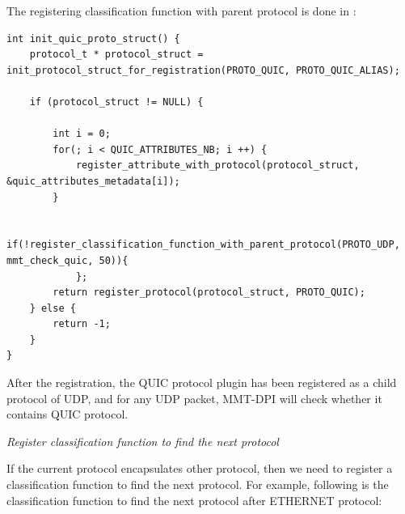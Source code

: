 The registering classification function with parent protocol is done in :

\begin{lstlisting}[style=Cpp]
int init_quic_proto_struct() {
    protocol_t * protocol_struct = init_protocol_struct_for_registration(PROTO_QUIC, PROTO_QUIC_ALIAS);

    if (protocol_struct != NULL) {

        int i = 0;
        for(; i < QUIC_ATTRIBUTES_NB; i ++) {
            register_attribute_with_protocol(protocol_struct, &quic_attributes_metadata[i]);
        }

        if(!register_classification_function_with_parent_protocol(PROTO_UDP, mmt_check_quic, 50)){
            };
        return register_protocol(protocol_struct, PROTO_QUIC);
    } else {
        return -1;
    }
}
\end{lstlisting}

After the registration, the QUIC protocol plugin has been registered as a child protocol of UDP, and for any UDP packet, MMT-DPI will check whether it contains QUIC protocol.

\textit{Register classification function to find the next protocol}

If the current protocol encapsulates other protocol, then we need to register a classification function to find the next protocol. For example, following is the classification function to find the next protocol after ETHERNET protocol:

